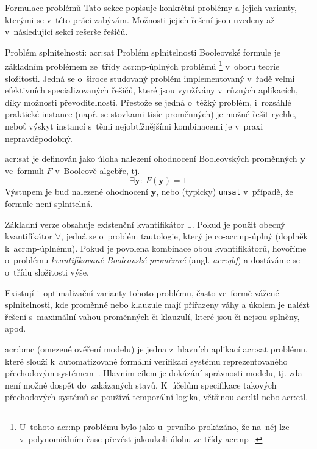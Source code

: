 \documentclass[thesis=M,czech]{FITthesis}[2012/06/26]
\newcommand{\acrlabel}[1]{acr:#1}
\newcommand{\acr}[1]{\acrshort{\acrlabel{#1}}}
\newcommand{\acrf}[1]{\acrfull{\acrlabel{#1}}}
\newcommand{\id}[1]{\texttt{#1}}
\newcommand{\hl}[1]{\textit{#1}}
\newcommand{\name}[1]{\hl{#1}}
\newcommand{\cit}[1]{\cite{#1}}
\renewcommand{\vec}[1]{\ensuremath{\boldsymbol{#1}}}
\begin{document}
\begin{section}{Formulace problémů}\label{s:theory:formulation}
Tato sekce popisuje konkrétní problémy a jejich varianty,
kterými se v~této práci zabývám.
Možnosti jejich řešení jsou uvedeny až v~následující sekci rešerše řešičů.


\begin{subsection}{Problém splnitelnosti: \acr{sat}}
\label{ss:theory:formulation:sat}
Problém splnitelnosti Booleovské formule
je základním problémem
ze~třídy \acr{np}-úplných problémů%
\footnote{U~tohoto \acr{np} problému
bylo jako u~prvního prokázáno,
že na~něj lze v~polynomiálním čase převést
jakoukoli úlohu ze třídy \acr{np}~\cit{cook-art}.}
v~oboru teorie složitosti.
Jedná se o~široce studovaný problém
implementovaný v~řadě velmi efektivních specializovaných řešičů,
které jsou využívány v~různých aplikacích,
díky možnosti převoditelnosti.
Přestože se jedná o~těžký problém,
i~rozsáhlé praktické instance
(např. se stovkami tisíc proměnných)
je možné řešit rychle,
neboť výskyt instancí s~těmi nejobtížnějšími kombinacemi
je v~praxi nepravděpodobný.

\acr{sat} je definován jako úloha nalezení ohodnocení
Booleovských proměnných \vec{y}
ve~formuli $F$ v~Booleově algebře,
tj.
\begin{equation}\label{eq:sat}
   \exists \vec{y} : \: F(\vec{y}) = 1
\end{equation}
Výstupem je buď nalezené ohodnocení \vec{y},
nebo (typicky) \id{unsat} v~případě, že formule není splnitelná.

Základní verze obsahuje existenční kvantifikátor $\exists$.
Pokud je použit obecný kvantifikátor $\forall$,
jedná se o~problém tautologie, který je co-\acr{np}-úplný
(doplněk k~\acr{np}-úplnému).
Pokud je povolena kombinace obou kvantifikátorů,
hovoříme o~problému \name{kvantifikované Booleovské proměnné}
(angl. \name{\acr{qbf}})
a dostáváme se o~třídu složitosti výše.

Existují i~optimalizační varianty tohoto problému,
často ve~formě vážené splnitelnosti,
kde proměnné nebo klauzule mají přiřazeny váhy
a úkolem je nalézt řešení s~maximální vahou
proměnných či klauzulí, které jsou či nejsou splněny, apod.


\begin{paragraph}{\acrf{bmc}}\label{p:theory:formulation:sat:bmc}
(omezené ověření modelu)
je jedna z~hlavních aplikací \acr{sat} problému,
které slouží k~automatizované formální verifikaci
systému reprezentovaného přechodovým systémem~\cit{bmc-art}.
Hlavním cílem je dokázání správnosti modelu,
tj. zda není možné dospět do~zakázaných stavů.
K~účelům specifikace takových přechodových systémů
se používá temporální logika,
většinou \acr{ltl} nebo \acr{ctl}.


\end{paragraph}
\end{subsection}
\end{section}
\end{document}
